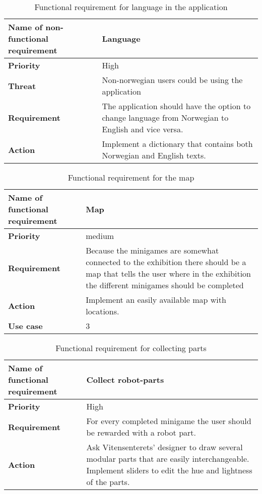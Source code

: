 \begin{table}[!h]
\caption{Functional requirement for language in the application}
\begin{tabular}{ |p{7cm}|p{7cm}| }
\hline
\textbf {Name of non-functional requirement} & {Language} \\ \hline
\textbf {Priority} & {High} \\ \hline
\textbf {Threat} & {Non-norwegian users could be using the application} \\ \hline
\textbf {Requirement} & {The application should have the option to change language from Norwegian to English and vice versa.} \\ \hline
\textbf {Action} & {Implement a dictionary that contains both Norwegian and English texts.} \\ \hline
\end{tabular}
\end{table}


\begin{table}[!h]\label{map_req}
\caption{Functional requirement for the map}
\begin{tabular}{ |p{7cm}|p{7cm}| }
\hline
\textbf {Name of functional requirement} & {Map} \\ \hline
\textbf {Priority} & {medium} \\ \hline
\textbf {Requirement} & {Because the minigames are somewhat connected to the exhibition there should be a map that tells the user where in the exhibition the different minigames should be completed} \\ \hline
\textbf {Action} & {Implement an easily available map with locations.} \\ \hline
\textbf {Use case} & {3} \\ \hline
\end{tabular}
\end{table}

\begin{table}[!h]
\caption{Functional requirement for collecting parts}
\begin{tabular}{ |p{7cm}|p{7cm}| }
\hline
\textbf {Name of functional requirement} & {Collect robot-parts} \\ \hline
\textbf {Priority} & {High} \\ \hline
\textbf {Requirement} & {For every completed minigame the user should be rewarded with a robot part.} \\ \hline
\textbf {Action} & {Ask Vitensenterets' designer to draw several modular parts that are easily interchangeable. Implement sliders to edit the hue and lightness of the parts.} \\ \hline
\end{tabular}
\end{table}

